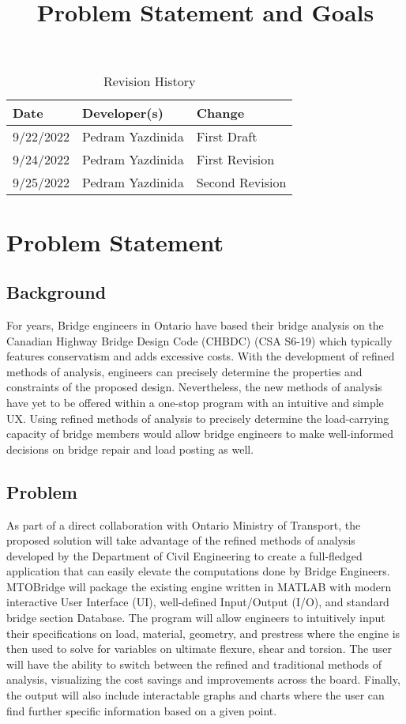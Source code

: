 \documentclass{article}
\title{Problem Statement and Goals\\\progname}
\author{\authname}
\date{}
\begin{document}
\maketitle

\begin{table}[hp]
\caption{Revision History} \label{TblRevisionHistory}
\begin{tabularx}{\textwidth}{llX}
\toprule
\textbf{Date} & \textbf{Developer(s)} & \textbf{Change}\\
\midrule
9/22/2022 & Pedram Yazdinida & First Draft\\
9/24/2022 & Pedram Yazdinida & First Revision\\
9/25/2022 & Pedram Yazdinida & Second Revision\\
\bottomrule
\end{tabularx}
\end{table}

\section{Problem Statement}

\subsection{Background}

For years, Bridge engineers in Ontario have based their bridge analysis on the Canadian Highway Bridge Design Code (CHBDC) (CSA S6-19) which typically features conservatism and adds excessive costs. With the development of refined methods of analysis, engineers can precisely determine the properties and constraints of the proposed design. Nevertheless, the new methods of analysis have yet to be offered within a one-stop program with an intuitive and simple UX. Using refined methods of analysis to precisely determine the load-carrying capacity of bridge members would allow bridge engineers to make well-informed decisions on bridge repair and load posting as well. 
 
\subsection{Problem}

As part of a direct collaboration with Ontario Ministry of Transport, the proposed solution will take advantage of the refined methods of analysis developed by the Department of Civil Engineering to create a full-fledged application that can easily elevate the computations done by Bridge Engineers. MTOBridge will package the existing engine written in MATLAB with modern interactive User Interface (UI), well-defined Input/Output (I/O), and standard bridge section Database. The program will allow engineers to intuitively input their specifications on load, material, geometry, and prestress where the engine is then used to solve for variables on ultimate flexure, shear and torsion. The user will have the ability to switch between the refined and traditional methods of analysis, visualizing the cost savings and improvements across the board. Finally, the output will also include interactable graphs and charts where the user can find further specific information based on a given point. 
\end{document}
